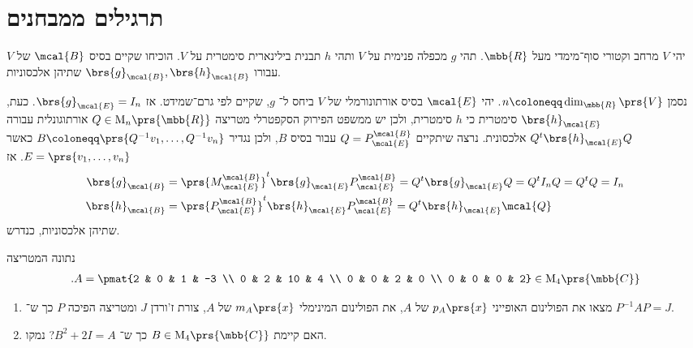 \documentclass[a4paper,10pt,twoside,openany]{book}
\renewcommand{\Mat}{\mathrm{M}}
\begin{document}
\chapter{תרגילים ממבחנים}

\begin{exercisechap}
יהי
$V$
מרחב וקטורי סוף־מימדי מעל
$\mbb{R}$.
תהי
$g$
מכפלה פנימית על
$V$
ותהי
$h$
תבנית בילינארית סימטרית על
$V$.
הוכיחו שקיים בסיס
$\mcal{B}$
של
$V$
עבורו
$\brs{g}_\mcal{B}, \brs{h}_\mcal{B}$
שתיהן אלכסוניות.
\end{exercisechap}

\begin{solution}
נסמן
$n \coloneqq \dim_{\mbb{R}}\prs{V}$.
יהי
$\mcal{E}$
בסיס אורתונורמלי של
$V$
ביחס ל־%
$g$,
שקיים לפי גרם־שמידט. אז
$\brs{g}_\mcal{E} = I_n$.
כעת,
$\brs{h}_\mcal{E}$
סימטרית כי
$h$
סימטרית, ולכן יש ממשפט הפירוק הסקפטרלי מטריצה
$Q \in \Mat_n\prs{\mbb{R}}$
אורתוגונלית עבורה
$Q^t \brs{h}_\mcal{E} Q$
אלכסונית.
נרצה שיתקיים
$Q = P^\mcal{B}_\mcal{E}$ עבור בסיס
$B$,
ולכן נגדיר
$B \coloneqq \prs{Q^{-1} v_1, \ldots, Q^{-1} v_n}$
כאשר
$E = \prs{v_1, \ldots, v_n}$.
אז
\begin{align*}
\brs{g}_\mcal{B} &= \prs{M^\mcal{B}_\mcal{E}}^t \brs{g}_\mcal{E} P^\mcal{B}_{\mcal{E}} = Q^t \brs{g}_\mcal{E} Q = Q^t I_n Q = Q^t Q = I_n \\
\brs{h}_\mcal{B} &= \prs{P^\mcal{B}_\mcal{E}}^t \brs{h}_\mcal{E} P^\mcal{B}_\mcal{E} = Q^t \brs{h}_\mcal{E} \mcal{Q}
\end{align*}
שתיהן אלכסוניות, כנדרש.
\end{solution}

\begin{exercisechap}
נתונה המטריצה
\begin{align*}
\text{.} A = \pmat{2 & 0 & 1 & -3 \\ 0 & 2 & 10 & 4 \\ 0 & 0 & 2 & 0 \\ 0 & 0 & 0 & 2} \in \Mat_4\prs{\mbb{C}}
\end{align*}
\begin{enumerate}
\item מצאו את הפולינום האופייני
$p_A\prs{x}$
של
$A$,
את הפולינום המינימלי
$m_A\prs{x}$
של
$A$,
צורת ז'ורדן
$J$
ומטריצה הפיכה
$P$
כך ש־%
$P^{-1} A P = J$.

\item
האם קיימת
$B \in \Mat_4\prs{\mbb{C}}$
כך ש־%
$B^2 + 2I = A$?
נמקו.
\end{enumerate}
\end{exercisechap}
\end{document}
